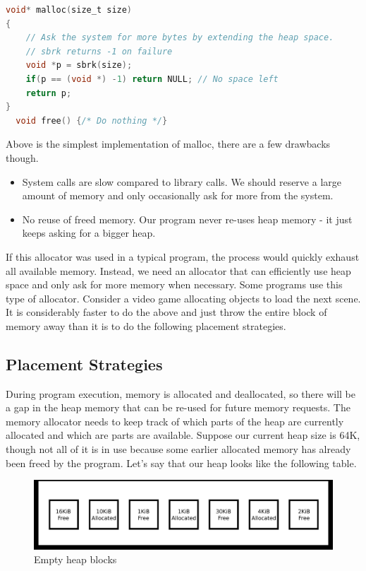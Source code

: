 \begin{lstlisting}[language=C]
void* malloc(size_t size)
{
    // Ask the system for more bytes by extending the heap space.
    // sbrk returns -1 on failure
    void *p = sbrk(size);
    if(p == (void *) -1) return NULL; // No space left
    return p;
}
  void free() {/* Do nothing */}
\end{lstlisting}

Above is the simplest implementation of malloc, there are a few drawbacks though.

\begin{itemize}
\item System calls are slow compared to library calls.
  We should reserve a large amount of memory and only occasionally ask for more from the system.
\item No reuse of freed memory.
  Our program never re-uses heap memory - it just keeps asking for a bigger heap.
\end{itemize}

If this allocator was used in a typical program, the process would quickly exhaust all available memory.
Instead, we need an allocator that can efficiently use heap space and only ask for more memory when necessary.
Some programs use this type of allocator.
Consider a video game allocating objects to load the next scene.
It is considerably faster to do the above and just throw the entire block of memory away than it is to do the following placement strategies.

\subsection{Placement Strategies}

During program execution, memory is allocated and deallocated, so there will be a gap in the heap memory that can be re-used for future memory requests.
The memory allocator needs to keep track of which parts of the heap are currently allocated and which are parts are available.
Suppose our current heap size is 64K, though not all of it is in use because some earlier allocated memory has already been freed by the program.
Let's say that our heap looks like the following table.

\begin{figure}[H]
\centering
\includegraphics[width=.9\textwidth]{malloc/drawings/heap_empty.eps}
\caption{Empty heap blocks}
\end{figure}

